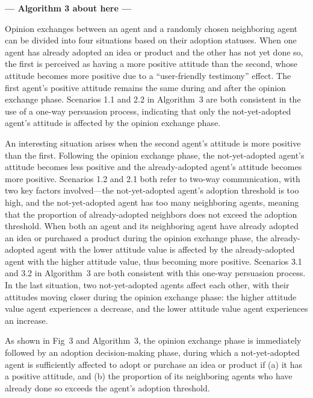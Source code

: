 \documentclass[10pt,letterpaper]{article}
\begin{document}


\begin{center}\textbf{--- Algorithm 3 about here ---}\end{center}


Opinion exchanges between an agent and a randomly chosen neighboring agent can be divided into four situations based on their adoption statuses. When one agent has already adopted an idea or product and the other has not yet done so, the first is perceived as having a more positive attitude than the second, whose attitude becomes more positive due to a ``user-friendly testimony'' effect. The first agent's positive attitude remains the same during and after the opinion exchange phase. Scenarios 1.1 and 2.2 in Algorithm~3 are both consistent in the use of a one-way persuasion process, indicating that only the not-yet-adopted agent's attitude is affected by the opinion exchange phase.

An interesting situation arises when the second agent's attitude is more positive than the first. Following the opinion exchange phase, the not-yet-adopted agent's attitude becomes less positive and the already-adopted agent's attitude becomes more positive. Scenarios 1.2 and 2.1 both refer to two-way communication, with two key factors involved---the not-yet-adopted agent's adoption threshold is too high, and the not-yet-adopted agent has too many neighboring agents, meaning that the proportion of already-adopted neighbors does not exceed the adoption threshold. When both an agent and its neighboring agent have already adopted an idea or purchased a product during the opinion exchange phase, the already-adopted agent with the lower attitude value is affected by the already-adopted agent with the higher attitude value, thus becoming more positive. Scenarios 3.1 and 3.2 in Algorithm~3 are both consistent with this one-way persuasion process. In the last situation, two not-yet-adopted agents affect each other, with their attitudes moving closer during the opinion exchange phase: the higher attitude value agent experiences a decrease, and the lower attitude value agent experiences an increase.

As shown in Fig~3 and Algorithm~3, the opinion exchange phase is immediately followed by an adoption decision-making phase, during which a not-yet-adopted agent is sufficiently affected to adopt or purchase an idea or product if (a) it has a positive attitude, and (b) the proportion of its neighboring agents who have already done so exceeds the agent's adoption threshold.
\end{document}
